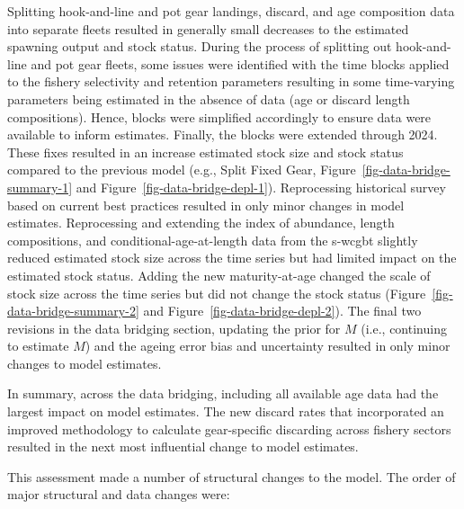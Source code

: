 \documentclass[
  english,
]{article}
\begin{document}
Splitting hook-and-line and pot gear landings, discard, and age
composition data into separate fleets resulted in generally small
decreases to the estimated spawning output and stock status. During the
process of splitting out hook-and-line and pot gear fleets, some issues
were identified with the time blocks applied to the fishery selectivity
and retention parameters resulting in some time-varying parameters being
estimated in the absence of data (age or discard length compositions).
Hence, blocks were simplified accordingly to ensure data were available
to inform estimates. Finally, the blocks were extended through 2024.
These fixes resulted in an increase estimated stock size and stock
status compared to the previous model (e.g., Split Fixed Gear,
Figure~\ref{fig-data-bridge-summary-1} and
Figure~\ref{fig-data-bridge-depl-1}). Reprocessing historical survey
based on current best practices resulted in only minor changes in model
estimates. Reprocessing and extending the index of abundance, length
compositions, and conditional-age-at-length data from the \gls{s-wcgbt}
slightly reduced estimated stock size across the time series but had
limited impact on the estimated stock status. Adding the new
maturity-at-age changed the scale of stock size across the time series
but did not change the stock status
(Figure~\ref{fig-data-bridge-summary-2} and
Figure~\ref{fig-data-bridge-depl-2}). The final two revisions in the
data bridging section, updating the prior for \(M\) (i.e., continuing to
estimate \(M\)) and the ageing error bias and uncertainty resulted in
only minor changes to model estimates.

In summary, across the data bridging, including all available age data
had the largest impact on model estimates. The new discard rates that
incorporated an improved methodology to calculate gear-specific
discarding across fishery sectors resulted in the next most influential
change to model estimates.

This assessment made a number of structural changes to the model. The
order of major structural and data changes were:
\end{document}
